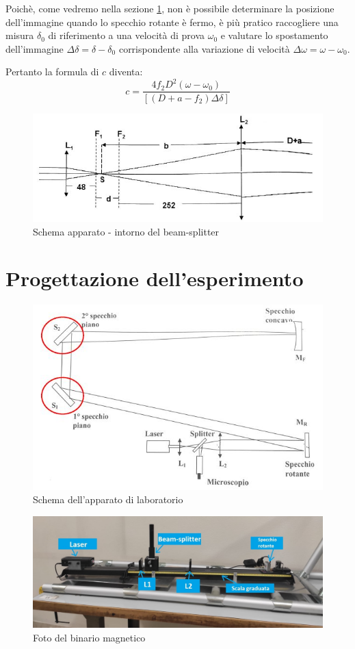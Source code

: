 \documentclass{article}
\begin{document}
Poichè, come vedremo nella sezione \ref{Prog_esperimento}, non è possibile determinare la posizione dell'immagine quando lo specchio rotante è fermo,
è più pratico raccogliere una misura $\delta_0$ di riferimento a una velocità di prova $\omega_0$ e valutare lo spostamento dell'immagine $\Delta\delta = \delta-\delta_0$
corrispondente alla variazione di velocità $\Delta\omega = \omega-\omega_0$.

Pertanto la formula di $c$ diventa:
\begin{equation}
    c = \frac{4f_2D^2(\omega-\omega_0)}{[(D+a-f_2)\Delta\delta]}
    \label{c_equation}
\end{equation}

\begin{figure}[h]
    \centering
        \includegraphics[width=0.6\linewidth]{IntroTeorica1.JPG}
    \caption{Schema apparato - intorno del beam-splitter}
\end{figure}


\newpage

\section{Progettazione dell'esperimento} \label{Prog_esperimento}

\begin{figure}[h] 
    \centering
    \includegraphics[width=0.6\linewidth]{Progettazione1.JPG}
    \caption{Schema dell'apparato di laboratorio}
    \label{schema_apparato}
\end{figure}

\begin{figure}[h]
    \centering
    \includegraphics[width=0.6\linewidth]{FotoBinario.jpg}
    \caption{Foto del binario magnetico}
    \label{FotoBinario}
\end{figure}
\end{document}

